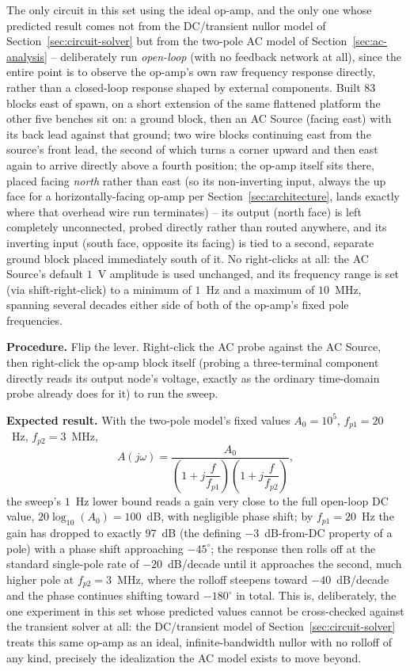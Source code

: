 The only circuit in this set using the ideal op-amp, and the only one whose predicted result
comes not from the DC/transient nullor model of Section~\ref{sec:circuit-solver} but from the
two-pole AC model of Section~\ref{sec:ac-analysis} -- deliberately run \emph{open-loop} (with
no feedback network at all), since the entire point is to observe the op-amp's own raw
frequency response directly, rather than a closed-loop response shaped by external
components. Built 83 blocks east of spawn, on a short extension of the same flattened
platform the other five benches sit on: a ground block, then an AC Source (facing east) with
its back lead against that ground; two wire blocks continuing east from the source's front
lead, the second of which turns a corner upward and then east again to arrive directly above
a fourth position; the op-amp itself sits there, placed facing \emph{north} rather than east
(so its non-inverting input, always the up face for a horizontally-facing op-amp per
Section~\ref{sec:architecture}, lands exactly where that overhead wire run terminates) --
its output (north face) is left completely unconnected, probed directly rather than routed
anywhere, and its inverting input (south face, opposite its facing) is tied to a second,
separate ground block placed immediately south of it. No right-clicks at all: the AC
Source's default $1$~V amplitude is used unchanged, and its frequency range is set (via
shift-right-click) to a minimum of $1$~Hz and a maximum of $10$~MHz, spanning several decades
either side of both of the op-amp's fixed pole frequencies.

\textbf{Procedure.} Flip the lever. Right-click the AC probe against the AC Source, then
right-click the op-amp block itself (probing a three-terminal component directly reads its
output node's voltage, exactly as the ordinary time-domain probe already does for it) to run
the sweep.

\textbf{Expected result.} With the two-pole model's fixed values $A_0 = 10^5$,
$f_{p1} = 20$~Hz, $f_{p2} = 3$~MHz,
\begin{equation}
A(j\omega) = \frac{A_0}{\left(1 + j\dfrac{f}{f_{p1}}\right)\left(1 + j\dfrac{f}{f_{p2}}\right)},
\end{equation}
the sweep's $1$~Hz lower bound reads a gain very close to the full open-loop DC value,
$20\log_{10}(A_0) = 100$~dB, with negligible phase shift; by $f_{p1} = 20$~Hz the gain has
dropped to exactly $97$~dB (the defining $-3$~dB-from-DC property of a pole) with a phase
shift approaching $-45^\circ$; the response then rolls off at the standard single-pole rate
of $-20$~dB/decade until it approaches the second, much higher pole at $f_{p2} = 3$~MHz,
where the rolloff steepens toward $-40$~dB/decade and the phase continues shifting toward
$-180^\circ$ in total. This is, deliberately, the one experiment in this set whose predicted
values cannot be cross-checked against the transient solver at all: the DC/transient model
of Section~\ref{sec:circuit-solver} treats this same op-amp as an ideal, infinite-bandwidth
nullor with no rolloff of any kind, precisely the idealization the AC model exists to move
beyond.
